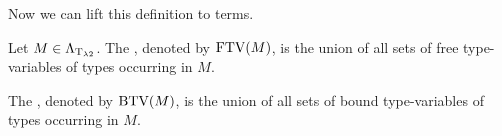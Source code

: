 Now we can lift this definition to terms.

\begin{definition}\label{def.2.5}
	Let $M\in\Lambda_{\text{T}_{\lambda2}}$. The , denoted by $\text{FTV}(M)$, is the union of all sets of free type-variables of types occurring in $M$.
	
	The , denoted by $\text{BTV}(M)$, is the union of all sets of bound type-variables of types occurring in $M$.
			
\end{definition}

